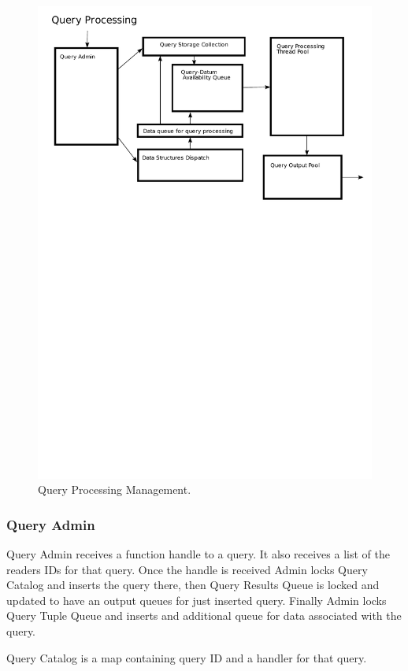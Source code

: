 \documentclass[14pt]{article}
\begin{document}
\begin{figure}
  \includegraphics[width=5.00in]{../figures/QueryProcessing.pdf}
  \caption{Query Processing Management.}
  \label{QueryProcessingPic}
\end{figure}

\subsubsection{Query Admin}

Query Admin receives a function handle to a query. It also receives a list of the readers IDs for that query. Once the handle is received Admin locks Query Catalog and inserts the query there, then Query Results Queue is locked and updated to have an output queues for just inserted query. Finally Admin locks Query Tuple Queue and inserts and additional queue for data associated with the query. 

Query Catalog is a map containing query ID and a handler for that query. 
\end{document}
